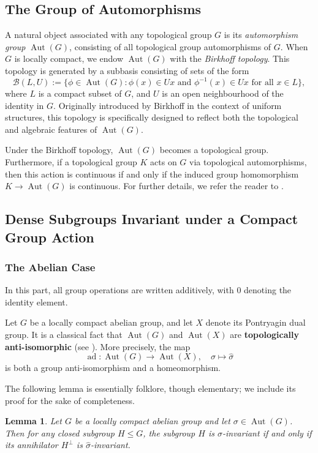 \documentclass[12pt]{amsart}
\newtheorem{lemma}[theorem]{Lemma}
\theoremstyle{definition}
\numberwithin{equation}{section}
\theoremstyle{remark}
\def\Aut{\operatorname{Aut}}
\def\ad{\operatorname{ad}}
\begin{document}
\subsection{The Group of Automorphisms}

A natural object associated with any topological group $G$ is its \emph{automorphism group} $\Aut(G)$, consisting of all topological group automorphisms of $G$. When $G$ is locally compact, we endow $\Aut(G)$ with the \emph{Birkhoff topology}. This topology is generated by a subbasis consisting of sets of the form
\[
\mathcal{B}(L, U) := \{ \phi \in \Aut(G) : \phi(x) \in Ux \text{ and } \phi^{-1}(x) \in Ux \text{ for all } x \in L \},
\]
where $L$ is a compact subset of $G$, and $U$ is an open neighbourhood of the identity in $G$. Originally introduced by Birkhoff in the context of uniform structures, this topology is specifically designed to reflect both the topological and algebraic features of $\Aut(G)$.

Under the Birkhoff topology, $\Aut(G)$ becomes a topological group. Furthermore, if a topological group $K$ acts on $G$ via topological automorphisms, then this action is continuous if and only if the induced group homomorphism $K \to \Aut(G)$ is continuous. For further details, we refer the reader to \cite[p.~260]{DPS}.

\subsection{Dense Subgroups Invariant under a Compact Group Action}
\subsubsection{The Abelian Case}

In this part, all group operations are written additively, with $0$ denoting the identity element.

Let $G$ be a locally compact abelian group, and let $X$ denote its Pontryagin dual group. It is a classical fact that $\Aut(G)$ and $\Aut(X)$ are \textbf{topologically anti-isomorphic} (see \cite[(26.9) Theorem]{HR}). More precisely, the map
\[
\ad: \Aut(G) \to \Aut(X), \quad \sigma \mapsto \widehat{\sigma}
\]
is both a group anti-isomorphism and a homeomorphism.

The following lemma is essentially folklore, though elementary; we include its proof for the sake of completeness.

\begin{lemma}\label{dual}
Let $G$ be a locally compact abelian group and let $\sigma \in \Aut(G)$. Then for any closed subgroup $H \leq G$, the subgroup $H$ is $\sigma$-invariant if and only if its annihilator $H^\perp$ is $\widehat{\sigma}$-invariant.
\end{lemma}
\end{document}
